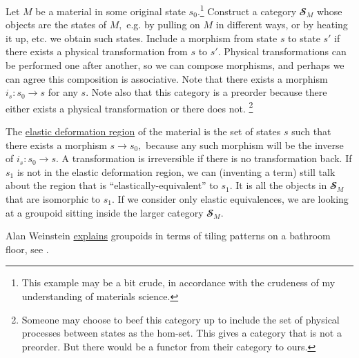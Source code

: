\documentclass[../main/CT4S-EN-RU]{subfiles}
\begin{document}
\begin{applicationENG}
Let $M$ be a material in some original state $s_0.$\footnote{This example may be a bit crude, in accordance with the crudeness of my understanding of materials science.} Construct a category ${𝓢}_M$ whose objects are the states of $M,$ e.g. by pulling on $M$ in different ways, or by heating it up, etc. we obtain such states. Include a morphism from state $s$ to state $s'$ if there exists a physical transformation from $s$ to $s'.$ Physical transformations can be performed one after another, so we can compose morphisms, and perhaps we can agree this composition is associative. Note that there exists a morphism $i_s\colon s_0{→} s$ for any $s.$ Note also that this category is a preorder because there either exists a physical transformation or there does not. 
\footnote{Someone may choose to beef this category up to include the set of physical processes between states as the hom-set. This gives a category that is not a preorder. But there would be a functor from their category to ours.}

The \href{http://en.wikipedia.org/wiki/Elastic_modulus}{\text elastic deformation region} of the material is the set of states $s$ such that there exists a morphism $s{→} s_0,$ because any such morphism will be the inverse of $i_s\colon s_0{→} s.$ A transformation is irreversible if there is no transformation back. If $s_1$ is not in the elastic deformation region, we can (inventing a term) still talk about the region that is “elastically-equivalent” to $s_1.$ It is all the objects in ${𝓢}_M$ that are isomorphic to $s_1.$ If we consider only elastic equivalences, we are looking at a groupoid sitting inside the larger category ${𝓢}_M.$
\end{applicationENG}

\begin{applicationRUS}
\end{applicationRUS}

\begin{exampleENG}
Alan Weinstein \href{http://www.ams.org/notices/199607/weinstein.pdf}{\text explains} groupoids in terms of tiling patterns on a bathroom floor, see \cite{WeA}.
\end{exampleENG}

\begin{exampleRUS}
\end{exampleRUS}
\end{document}
